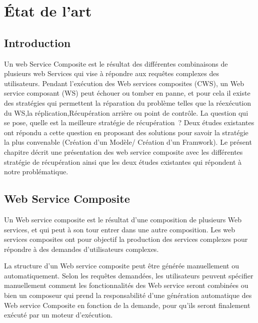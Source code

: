
\vspace{1cm}
\section{État de l'art}

\subsection{Introduction}

Un web Service Composite est  le résultat des différentes combinaisons de plusieurs web Services qui vise à répondre aux requêtes complexes des utilisateurs.
Pendant l'exécution des Web services composites (CWS), un Web service composant (WS) peut échouer ou tomber en panne, et pour cela il existe des stratégies qui permettent la réparation du problème telles que  la réexécution du WS,la réplication,Récupération arrière ou point de contrôle.
La question qui se pose, quelle est la meilleure stratégie de récupération ? 
Deux études existantes ont répondu a cette question en proposant des solutions pour savoir la stratégie la plus convenable (Création d’un Modèle/ Création d’un Framwork). 
Le présent chapitre décrit une présentation des web service composite avec les différentes stratégie de récupération ainsi que les deux études existantes qui répondent à notre problématique.

\subsection{Web Service Composite}

Un Web service composite est le résultat d’une composition de plusieurs Web services, et qui peut à son tour entrer dans une autre composition.
Les web services composites ont pour objectif  la production des services complexes pour répondre à des demandes d’utilisateurs complexes. 


La structure d’un Web service composite peut être générée manuellement ou automatiquement. Selon les requêtes demandées, les utilisateurs peuvent spécifier manuellement comment les fonctionnalités des Web service seront combinées ou bien  un composeur qui prend la responsabilité d’une génération automatique des Web service Composite en fonction de la demande, pour qu’ils seront finalement exécuté par un moteur d’exécution.


